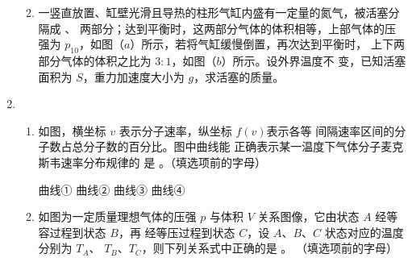 \begin{enumerate}
\begin{enumerate}

\item 
一竖直放置、缸壁光滑且导热的柱形气缸内盛有一定量的氮气，被活塞分隔成  、
 两部分；达到平衡时，这两部分气体的体积相等，上部气体的压
强为 $ p_{10} $，如图（$ a $）所示，若将气缸缓慢倒置，再次达到平衡时，
上下两部分气体的体积之比为 $ 3:1 $，如图（$ b $）所示。设外界温度不
变，已知活塞面积为 $ S $，重力加速度大小为 $ g $，求活塞的质量。
\begin{figure}[h!]
	\centering
\begin{subfigure}{0.4\linewidth}
	\centering
	 
	\caption{}\label{}
\end{subfigure}
\begin{subfigure}{0.4\linewidth}
	\centering
	 
	\caption{}\label{}
\end{subfigure}
\end{figure}


	
\end{enumerate}


\item 
{}
\begin{enumerate}
	\item
如图，横坐标 $ v $ 表示分子速率，纵坐标 $ f(v) $表示各等
间隔速率区间的分子数占总分子数的百分比。图中曲线能
正确表示某一温度下气体分子麦克斯韦速率分布规律的
是
 \underlinegap 
。（填选项前的字母）
\begin{figure}[h!]
	\centering
	
\end{figure}

\fourchoices
{曲线①}
{曲线②}
{曲线③}
{曲线④}



\item 
如图为一定质量理想气体的压强 $ p $ 与体积 $ V $ 关系图像，它由状态 $ A $ 经等容过程到状态 $ B $，再
经等压过程到状态 $ C $，设 $ A $、$ B $、$ C $ 状态对应的温度分别为 $ T_{A} $、
$ T_{B} $、$ T_{C} $，则下列关系式中正确的是
 \underlinegap 
。
（填选项前的字母）
\begin{figure}[h!]
	\centering
	
\end{figure}


\end{enumerate}
\end{enumerate}
